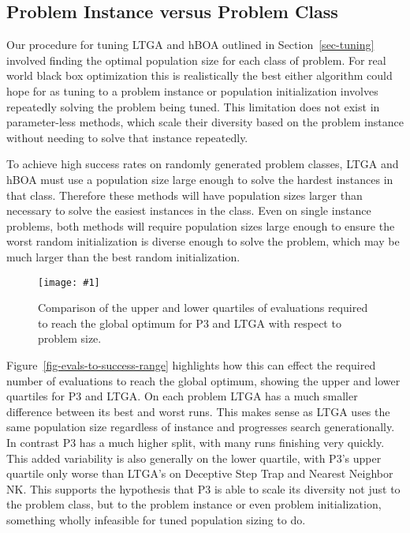 \documentclass[twoside]{article}
\newcommand{\includegraphicsfit}[1]
{\texttt{[image: \#1]}}
\begin{document}
\subsection{Problem Instance versus Problem Class}
Our procedure for tuning LTGA and hBOA outlined in Section~\ref{sec-tuning} involved finding
the optimal population size for each class of problem. For real world black box optimization this is
realistically the best either algorithm could hope for as tuning to a problem
instance or population initialization involves repeatedly solving the problem being tuned.
This limitation does not exist in parameter-less methods, which scale their diversity
based on the problem instance without needing to solve that instance repeatedly.

To achieve high success rates on randomly generated problem classes, LTGA and hBOA must use a population size
large enough to solve the hardest instances in that class. Therefore these methods will have
population sizes larger than necessary to solve the easiest instances in the class. Even
on single instance problems, both methods will require population sizes large enough to
ensure the worst random initialization is diverse enough to solve the problem, which may be
much larger than the best random initialization.

\begin{figure}
  \begin{center}
  \includegraphicsfit{evals-to-success-boxplot}
  \end{center}
  \caption{Comparison of the upper and lower quartiles of evaluations required
           to reach the global optimum for P3 and LTGA with respect to problem size.}
  \label{fig-evals-to-success-boxplot}
\end{figure}


Figure~\ref{fig-evals-to-success-range}
highlights how this can effect the required number of evaluations to reach the global optimum, showing
the upper and lower quartiles for P3 and LTGA. On each problem
LTGA has a much smaller difference between its best and worst runs. This makes sense as LTGA uses the same
population size regardless of instance and progresses search generationally. In contrast P3 has a much
higher split, with many runs finishing very quickly. This added variability is also generally on the lower
quartile, with P3's upper quartile only worse than LTGA's on Deceptive Step Trap and Nearest
Neighbor NK. This supports the hypothesis that P3 is able to scale its diversity not just
to the problem class, but to the problem instance or even problem initialization, something
wholly infeasible for tuned population sizing to do.
\end{document}
